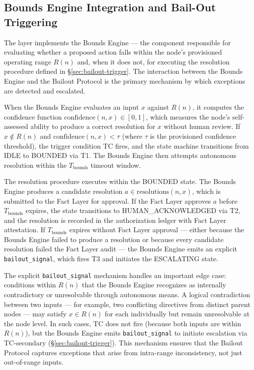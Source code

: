 \subsection{Bounds Engine Integration and Bail-Out Triggering}

The \bounds{} layer implements the Bounds Engine — the component responsible for evaluating whether a proposed action falls within the node's provisioned operating range $R(n)$ and, when it does not, for executing the resolution procedure defined in \S\ref{sec:bailout-trigger}. The interaction between the Bounds Engine and the Bailout Protocol is the primary mechanism by which exceptions are detected and escalated.

When the Bounds Engine evaluates an input $x$ against $R(n)$, it computes the confidence function $\text{confidence}(n, x) \in [0, 1]$, which measures the node's self-assessed ability to produce a correct resolution for $x$ without human review. If $x \notin R(n)$ and $\text{confidence}(n, x) < \tau$ (where $\tau$ is the provisioned confidence threshold), the trigger condition TC fires, and the state machine transitions from IDLE to BOUNDED via T1. The Bounds Engine then attempts autonomous resolution within the $T_{\text{bounds}}$ timeout window.

The resolution procedure executes within the BOUNDED state. The Bounds Engine produces a candidate resolution $a \in \text{resolutions}(n, x)$, which is submitted to the Fact Layer for approval. If the Fact Layer approves $a$ before $T_{\text{bounds}}$ expires, the state transitions to HUMAN\_ACKNOWLEDGED via T2, and the resolution is recorded in the authorization ledger with Fact Layer attestation. If $T_{\text{bounds}}$ expires without Fact Layer approval — either because the Bounds Engine failed to produce a resolution or because every candidate resolution failed the Fact Layer audit — the Bounds Engine emits an explicit \texttt{bailout\_signal}, which fires T3 and initiates the ESCALATING state.

The explicit \texttt{bailout\_signal} mechanism handles an important edge case: conditions within $R(n)$ that the Bounds Engine recognizes as internally contradictory or unresolvable through autonomous means. A logical contradiction between two inputs — for example, two conflicting directives from distinct parent nodes — may satisfy $x \in R(n)$ for each individually but remain unresolvable at the node level. In such cases, TC does not fire (because both inputs are within $R(n)$), but the Bounds Engine emits \texttt{bailout\_signal} to initiate escalation via TC-secondary (\S\ref{sec:bailout-trigger}). This mechanism ensures that the Bailout Protocol captures exceptions that arise from intra-range inconsistency, not just out-of-range inputs.

